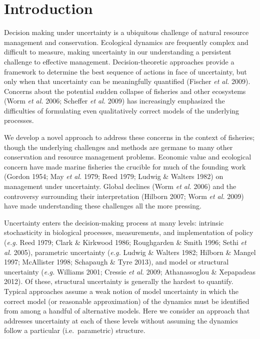 \documentclass[author-year, 12pt,review]{elsarticle} %
\begin{document}
\section{Introduction}\label{introduction}

Decision making under uncertainty is a ubiquitous challenge of natural
resource management and conservation. Ecological dynamics are frequently
complex and difficult to measure, making uncertainty in our
understanding a persistent challenge to effective management.
Decision-theoretic approaches provide a framework to determine the best
sequence of actions in face of uncertainty, but only when that
uncertainty can be meaningfully quantified (Fischer \emph{et al.} 2009).
Concerns about the potential sudden collapse of fisheries and other
ecosystems (Worm \emph{et al.} 2006; Scheffer \emph{et al.} 2009) has
increasingly emphasized the difficulties of formulating even
qualitatively correct models of the underlying processes.

We develop a novel approach to address these concerns in the context of
fisheries; though the underlying challenges and methods are germane to
many other conservation and resource management problems. Economic value
and ecological concern have made marine fisheries the crucible for much
of the founding work (Gordon 1954; May \emph{et al.} 1979; Reed 1979;
Ludwig \& Walters 1982) on management under uncertainty. Global declines
(Worm \emph{et al.} 2006) and the controversy surrounding their
interpretation (Hilborn 2007; Worm \emph{et al.} 2009) have made
understanding these challenges all the more pressing.

Uncertainty enters the decision-making process at many levels: intrinsic
stochasticity in biological processes, measurements, and implementation
of policy (\emph{e.g.} Reed 1979; Clark \& Kirkwood 1986; Roughgarden \&
Smith 1996; Sethi \emph{et al.} 2005), parametric uncertainty
(\emph{e.g.} Ludwig \& Walters 1982; Hilborn \& Mangel 1997; McAllister
1998; Schapaugh \& Tyre 2013), and model or structural uncertainty
(\emph{e.g.} Williams 2001; Cressie \emph{et al.} 2009; Athanassoglou \&
Xepapadeas 2012). Of these, structural uncertainty is generally the
hardest to quantify. Typical approaches assume a weak notion of model
uncertainty in which the correct model (or reasonable approximation) of
the dynamics must be identified from among a handful of alternative
models. Here we consider an approach that addresses uncertainty at each
of these levels without assuming the dynamics follow a particular
(i.e.~parametric) structure.
\end{document}
